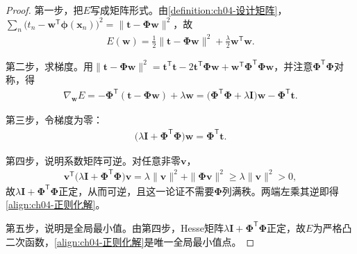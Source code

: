 \documentclass[../../main.tex]{subfiles}
\begin{document}
\begin{proof}
第一步，把$E$写成矩阵形式。由\cref{definition:ch04-设计矩阵}，$\sum_n\bigl(t_n-\boldsymbol{w}^{\mathsf{T}}\boldsymbol{\phi}(\boldsymbol{x}_n)\bigr)^2=\|\boldsymbol{t}-\boldsymbol{\Phi}\boldsymbol{w}\|^2$，故
\begin{align*}
  E(\boldsymbol{w})=\frac{1}{2}\|\boldsymbol{t}-\boldsymbol{\Phi}\boldsymbol{w}\|^2+\frac{\lambda}{2}\boldsymbol{w}^{\mathsf{T}}\boldsymbol{w}.
\end{align*}

第二步，求梯度。用$\|\boldsymbol{t}-\boldsymbol{\Phi}\boldsymbol{w}\|^2=\boldsymbol{t}^{\mathsf{T}}\boldsymbol{t}-2\boldsymbol{t}^{\mathsf{T}}\boldsymbol{\Phi}\boldsymbol{w}+\boldsymbol{w}^{\mathsf{T}}\boldsymbol{\Phi}^{\mathsf{T}}\boldsymbol{\Phi}\boldsymbol{w}$，并注意$\boldsymbol{\Phi}^{\mathsf{T}}\boldsymbol{\Phi}$对称，得
\begin{align*}
  \nabla_{\boldsymbol{w}}E=-\boldsymbol{\Phi}^{\mathsf{T}}(\boldsymbol{t}-\boldsymbol{\Phi}\boldsymbol{w})+\lambda\boldsymbol{w}
  =\bigl(\boldsymbol{\Phi}^{\mathsf{T}}\boldsymbol{\Phi}+\lambda\boldsymbol{I}\bigr)\boldsymbol{w}-\boldsymbol{\Phi}^{\mathsf{T}}\boldsymbol{t}.
\end{align*}

第三步，令梯度为零：
\begin{align*}
  \bigl(\lambda\boldsymbol{I}+\boldsymbol{\Phi}^{\mathsf{T}}\boldsymbol{\Phi}\bigr)\boldsymbol{w}=\boldsymbol{\Phi}^{\mathsf{T}}\boldsymbol{t}.
\end{align*}

第四步，说明系数矩阵可逆。对任意非零$\boldsymbol{v}$，
\begin{align*}
  \boldsymbol{v}^{\mathsf{T}}\bigl(\lambda\boldsymbol{I}+\boldsymbol{\Phi}^{\mathsf{T}}\boldsymbol{\Phi}\bigr)\boldsymbol{v}
  =\lambda\|\boldsymbol{v}\|^2+\|\boldsymbol{\Phi}\boldsymbol{v}\|^2\geqslant\lambda\|\boldsymbol{v}\|^2>0,
\end{align*}
故$\lambda\boldsymbol{I}+\boldsymbol{\Phi}^{\mathsf{T}}\boldsymbol{\Phi}$正定，从而可逆，且这一论证不需要$\boldsymbol{\Phi}$列满秩。两端左乘其逆即得\eqref{align:ch04-正则化解}。

第五步，说明是全局最小值。由第四步，Hesse矩阵$\lambda\boldsymbol{I}+\boldsymbol{\Phi}^{\mathsf{T}}\boldsymbol{\Phi}$正定，故$E$为严格凸二次函数，\eqref{align:ch04-正则化解}是唯一全局最小值点。
\end{proof}
\end{document}

